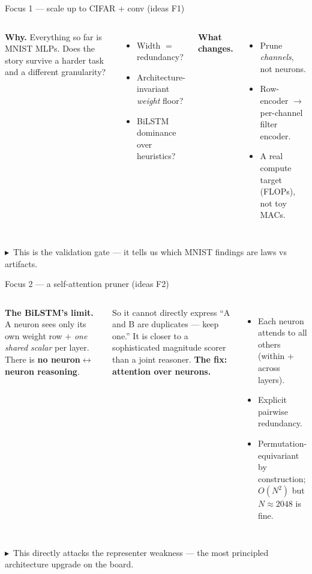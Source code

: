 \documentclass[10pt,aspectratio=169]{beamer}
\newcommand{\tk}[1]{{\scriptsize \textcolor{accent}{$\blacktriangleright$}\ #1}}
\begin{document}
\begin{frame}{Focus 1 --- scale up to CIFAR + conv (ideas F1)}
  \begin{columns}[T,onlytextwidth]
      \textbf{Why.} Everything so far is MNIST MLPs. Does the story survive a harder task and a different granularity?
      \begin{itemize}
        \item Width $=$ redundancy?
        \item Architecture-invariant \emph{weight} floor?
        \item BiLSTM dominance over heuristics?
      \end{itemize}
      \textbf{What changes.}
      \begin{itemize}
        \item Prune \emph{channels}, not neurons.
        \item Row-encoder $\to$ per-channel filter encoder.
        \item A real compute target (FLOPs), not toy MACs.
      \end{itemize}
  \end{columns}
  \vspace{0.6em}
  \tk{This is the validation gate --- it tells us which MNIST findings are laws vs artifacts.}
\end{frame}

\begin{frame}{Focus 2 --- a self-attention pruner (ideas F2)}
  \begin{columns}[T,onlytextwidth]
      \textbf{The BiLSTM's limit.} A neuron sees only its own weight row $+$ \emph{one shared scalar} per layer. There is \textbf{no neuron$\leftrightarrow$neuron reasoning}.
      \vspace{0.5em}

      So it cannot directly express ``A and B are duplicates --- keep one.'' It is closer to a sophisticated magnitude scorer than a joint reasoner.
      \textbf{The fix: attention over neurons.}
      \begin{itemize}
        \item Each neuron attends to all others (within + across layers).
        \item Explicit pairwise redundancy.
        \item Permutation-equivariant by construction; $O(N^2)$ but $N\!\approx\!2048$ is fine.
      \end{itemize}
  \end{columns}
  \vspace{0.6em}
  \tk{This directly attacks the representer weakness --- the most principled architecture upgrade on the board.}
\end{frame}
\end{document}
